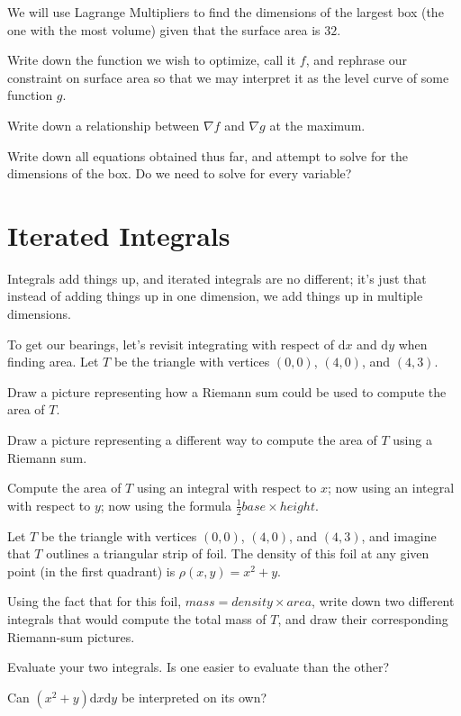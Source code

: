 \documentclass{problemset}
\begin{document}
	\question
	We will use Lagrange Multipliers to find the dimensions of the largest box (the one with the most volume)
	given that the surface area is $32$.
	\begin{parts}
		\item Write down the function we wish to optimize, call it $f$, and rephrase our constraint
			on surface area so that we may interpret it as the level curve of some function $g$.
		\item Write down a relationship between $\nabla f$ and $\nabla g$ at the maximum.
		\item Write down all equations obtained thus far, and attempt to solve for the dimensions of the box.
			Do we need to solve for every variable?
	\end{parts}
\newpage

\section*{Iterated Integrals}
	Integrals add things up, and iterated integrals are no different; it's just that instead of adding things
	up in one dimension, we add things up in multiple dimensions.

	\question
	To get our bearings, let's revisit integrating with respect of $\mathrm{d}x$ and $\mathrm{d}y$
	when finding area.  Let $T$ be the triangle with vertices $(0,0)$, $(4,0)$, and $(4,3)$.
	\begin{parts}
		\item Draw a picture representing how a Riemann sum could be used to compute the area of $T$.
		\item Draw a picture representing a different way to compute the area of $T$ using a Riemann sum.
		\item Compute the area of $T$ using an integral with respect to $x$; now using an integral with 
			respect to $y$; now using the formula $\frac{1}{2}base\times height$.
	\end{parts}

	\question
	Let $T$ be the triangle with vertices $(0,0)$, $(4,0)$, and $(4,3)$, and imagine that $T$
	outlines a triangular strip of foil.  The density of this foil at any given point (in the 
	first quadrant) is
	$\rho(x,y) = x^2+y$.
	\begin{parts}
		\item Using the fact that for this foil, $mass=density\times area$, write down two different
			integrals that would compute the total mass of $T$, and draw their corresponding
			Riemann-sum pictures.
		\item Evaluate your two integrals.  Is one easier to evaluate than the other?
		\item Can $(x^2+y)\mathrm{d}x\mathrm{d}y$ be interpreted on its own?
	\end{parts}
\end{document}
